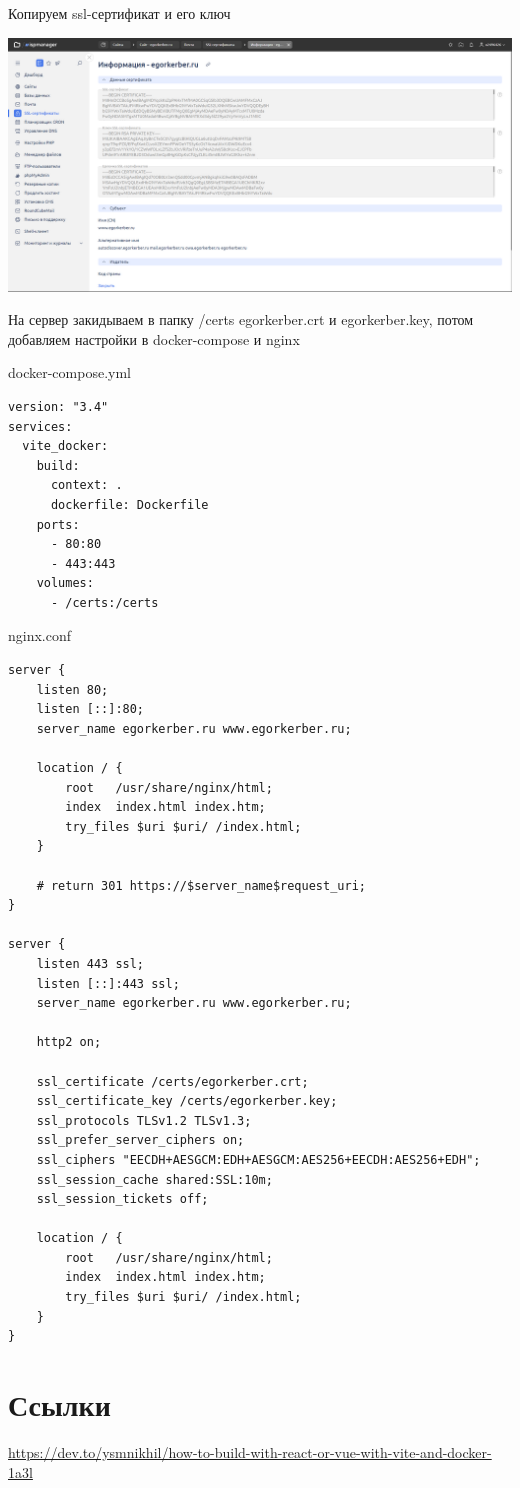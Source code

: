 \documentclass[14pt, a4paper]{extarticle}
\begin{document}
Копируем ssl-сертификат и его ключ

\includegraphics*[width=0.8\linewidth]{img/2024-02-19-19-11-31.png}

На сервер закидываем в папку /certs egorkerber.crt и egorkerber.key, потом добавляем настройки в docker-compose и nginx 

docker-compose.yml 

\begin{lstlisting}
version: "3.4"
services:
  vite_docker:
    build:
      context: .
      dockerfile: Dockerfile
    ports:
      - 80:80
      - 443:443
    volumes:
      - /certs:/certs
\end{lstlisting}

nginx.conf

\begin{lstlisting}
server {
    listen 80;
    listen [::]:80;
    server_name egorkerber.ru www.egorkerber.ru;
    
    location / {
        root   /usr/share/nginx/html;
        index  index.html index.htm;
        try_files $uri $uri/ /index.html;
    }
    
    # return 301 https://$server_name$request_uri;
}

server {
    listen 443 ssl;
    listen [::]:443 ssl;
    server_name egorkerber.ru www.egorkerber.ru;

    http2 on;

    ssl_certificate /certs/egorkerber.crt;
    ssl_certificate_key /certs/egorkerber.key;
    ssl_protocols TLSv1.2 TLSv1.3;
    ssl_prefer_server_ciphers on;
    ssl_ciphers "EECDH+AESGCM:EDH+AESGCM:AES256+EECDH:AES256+EDH";
    ssl_session_cache shared:SSL:10m;
    ssl_session_tickets off;

    location / {
        root   /usr/share/nginx/html;
        index  index.html index.htm;
        try_files $uri $uri/ /index.html;
    }
}
\end{lstlisting} 

\section*{Ссылки}

\href{https://dev.to/ysmnikhil/how-to-build-with-react-or-vue-with-vite-and-docker-1a3l}{https://dev.to/ysmnikhil/how-to-build-with-react-or-vue-with-vite-and-docker-1a3l}
\end{document}
